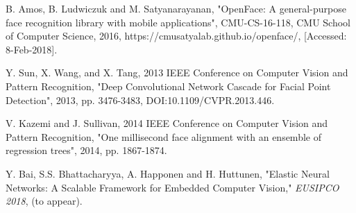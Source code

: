 \documentclass[conference]{IEEEtran}
\begin{document}
\begin{thebibliography}{00}
B. Amos, B. Ludwiczuk and M. Satyanarayanan, "OpenFace: A general-purpose face recognition library with mobile applications", CMU-CS-16-118, CMU School of Computer Science, 2016, https://cmusatyalab.github.io/openface/, [Accessed: 8-Feb-2018].





 Y. Sun, X. Wang, and X. Tang, 2013 IEEE Conference on Computer Vision and Pattern Recognition, "Deep Convolutional Network Cascade for Facial Point Detection", 2013, pp. 3476-3483, DOI:10.1109/CVPR.2013.446.


V. Kazemi and J. Sullivan, 2014 IEEE Conference on Computer Vision and Pattern Recognition, "One millisecond face alignment with an ensemble of regression trees", 2014, pp. 1867-1874.

 Y. Bai, S.S. Bhattacharyya, A. Happonen and H. Huttunen, "Elastic Neural Networks: A Scalable Framework for Embedded Computer Vision," \textit{EUSIPCO 2018}, (to appear).



\end{thebibliography}
\end{document}
